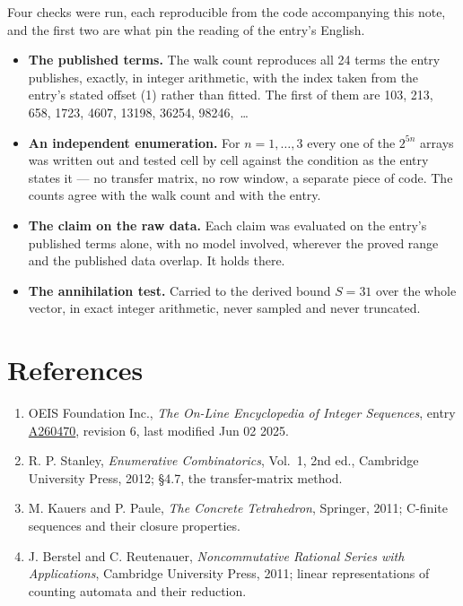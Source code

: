\documentclass[11pt]{article}
\theoremstyle{definition}
\begin{document}
Four checks were run, each reproducible from the code accompanying this note, and the first two are what pin the reading of the entry's English.

\begin{itemize}

\item {\bfseries The published terms.} The walk count reproduces all 24 terms the entry publishes, exactly, in integer arithmetic, with the index taken from the entry's stated offset (1) rather than fitted. The first of them are 103, 213, 658, 1723, 4607, 13198, 36254, 98246,~\dots

\item {\bfseries An independent enumeration.} For $n = 1,\dots,3$ every one of the $2^{5n}$ arrays was written out and tested cell by cell against the condition as the entry states it --- no transfer matrix, no row window, a separate piece of code. The counts agree with the walk count and with the entry.

\item {\bfseries The claim on the raw data.} Each claim was evaluated on the entry's published terms alone, with no model involved, wherever the proved range and the published data overlap. It holds there.

\item {\bfseries The annihilation test.} Carried to the derived bound $S = 31$ over the whole vector, in exact integer arithmetic, never sampled and never truncated.

\end{itemize}

\section{References}

\begin{enumerate}

\item OEIS Foundation Inc., \emph{The On-Line Encyclopedia of Integer Sequences}, entry \href{https://oeis.org/A260470}{A260470}, revision 6, last modified Jun 02 2025.

\item R. P. Stanley, \emph{Enumerative Combinatorics}, Vol.~1, 2nd ed., Cambridge University Press, 2012; \S4.7, the transfer-matrix method.

\item M. Kauers and P. Paule, \emph{The Concrete Tetrahedron}, Springer, 2011; C-finite sequences and their closure properties.

\item J. Berstel and C. Reutenauer, \emph{Noncommutative Rational Series with Applications}, Cambridge University Press, 2011; linear representations of counting automata and their reduction.

\end{enumerate}
\end{document}
